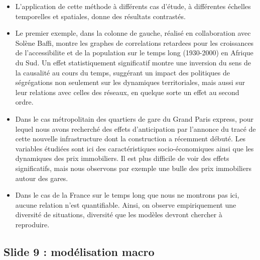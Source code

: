 \documentclass[11pt]{article}
\begin{document}
\begin{itemize}
	\item L'application de cette méthode à différents cas d'étude, à différentes échelles temporelles et spatiales, donne des résultats contrastés.
	\item Le premier exemple, dans la colonne de gauche, réalisé en collaboration avec Solène Baffi, montre les graphes de correlations retardees pour les croissances de l'accessibilite et de la population sur le temps long (1930-2000) en Afrique du Sud. Un effet statistiquement significatif montre une inversion du sens de la causalité au cours du temps, suggérant un impact des politiques de ségrégations non seulement sur les dynamiques territoriales, mais aussi sur leur relations avec celles des réseaux, en quelque sorte un effet au second ordre.
	\item Dans le cas métropolitain des quartiers de gare du Grand Paris express, pour lequel nous avons recherché des effets d'anticipation par l'annonce du tracé de cette nouvelle infrastructure dont la construction a récemment débuté. Les variables étudiées sont ici des caractéristiques socio-économiques ainsi que les dynamiques des prix immobiliers. Il est plus difficile de voir des effets significatifs, mais nous observons par exemple une bulle des prix immobiliers autour des gares.
	\item Dans le cas de la France sur le temps long que nous ne montrons pas ici, aucune relation n'est quantifiable. Ainsi, on observe empiriquement une diversité de situations, diversité que les modèles devront chercher à reproduire.
\end{itemize}




\subsection*{Slide 9 : modélisation macro}

\end{document}

